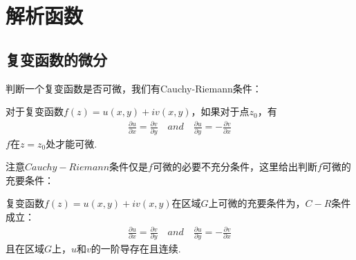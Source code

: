 \documentclass[lang=cn, titlestyle=display, scheme=chinese]{elegantbook}
\begin{document}
        \section{解析函数}

            \subsection{复变函数的微分}
                判断一个复变函数是否可微，我们有Cauchy-Riemann条件：
                \begin{theorem}\label{the:Cauchy-Riemann_condition}
                    对于复变函数$f(z) = u(x,y) + iv(x,y)$，如果对于点$z_0$，有
                    \begin{align}
                        \frac{\partial u}{\partial x} = \frac{\partial v}{\partial y} \quad and \quad \frac{\partial u}{\partial y} = -\frac{\partial v}{\partial x}
                    \end{align}
                    $f$在$z = z_0$处才能可微.
                \end{theorem}

                注意$Cauchy-Riemann$条件仅是$f$可微的必要不充分条件，这里给出判断$f$可微的充要条件：
                \begin{theorem}\label{the:differentiability_of_complex_function}
                    复变函数$f(z) = u(x, y) + iv(x, y)$在区域$G$上可微的充要条件为，$C-R$条件成立：
                    \begin{align*}
                        \frac{\partial u}{\partial x} = \frac{\partial v}{\partial y} \quad and \quad \frac{\partial u}{\partial y} = -\frac{\partial v}{\partial x}
                    \end{align*}
                    且在区域$G$上，$u$和$v$的一阶导存在且连续.
                \end{theorem}
\end{document}
